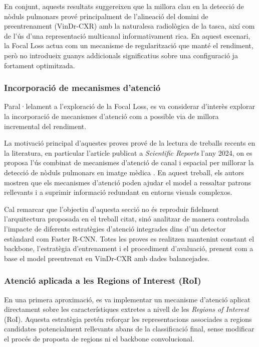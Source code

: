 \documentclass[conference]{IEEEtran}
\begin{document}
En conjunt, aquests resultats suggereixen que la millora clau en la detecció de
nòduls pulmonars prové principalment de l’alineació del domini de preentrenament
(VinDr-CXR) amb la naturalesa radiològica de la tasca, així com de l’ús d’una
representació multicanal informativament rica. En aquest escenari, la Focal Loss
actua com un mecanisme de regularització que manté el rendiment, però no introdueix
guanys addicionals significatius sobre una configuració ja fortament optimitzada.



\subsubsection{Incorporació de mecanismes d’atenció}

Paral·lelament a l’exploració de la Focal Loss,  es va considerar d’interès explorar la incorporació de
mecanismes d’atenció com a possible via de millora incremental del rendiment.

La motivació principal d’aquestes proves prové de la lectura de treballs recents en la
literatura, en particular l’article publicat a \textit{Scientific Reports} l’any 2024,
on es proposa l’ús combinat de mecanismes d’atenció de canal i espacial per millorar la
detecció de nòduls pulmonars en imatge mèdica \cite{scirep2024_attention}. En aquest
treball, els autors mostren que els mecanismes d’atenció poden ajudar el model a
ressaltar patrons rellevants i a suprimir informació redundant en entorns visuals
complexos.

Cal remarcar que l’objectiu d’aquesta secció no és reproduir fidelment l’arquitectura
proposada en el treball citat, sinó analitzar de manera controlada l’impacte de diferents
estratègies d’atenció integrades dins d’un detector estàndard com Faster R-CNN. Totes les
proves es realitzen mantenint constant el backbone, l’estratègia d’entrenament i el
procediment d’avaluació, prenent com a base el model preentrenat en VinDr-CXR amb dades
balancejades.

\subsubsection{Atenció aplicada a les Regions of Interest (RoI)}

En una primera aproximació, es va implementar un mecanisme d’atenció aplicat directament
sobre les característiques extretes a nivell de les \textit{Regions of Interest} (RoI).
Aquesta estratègia pretén reforçar les representacions associades a regions candidates
potencialment rellevants abans de la classificació final, sense modificar el procés de
proposta de regions ni el backbone convolucional.
\end{document}
